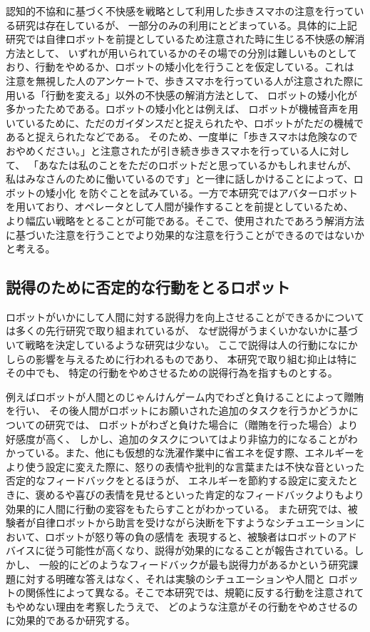 \documentclass{kuisthesis}
\begin{document}
認知的不協和に基づく不快感を戦略として利用した歩きスマホの注意を行っている研究\cite{Schneider2022}は存在しているが、
一部分のみの利用にとどまっている。具体的に上記研究では自律ロボットを前提としているため注意された時に生じる不快感の解消方法として、
いずれが用いられているかのその場での分別は難しいものとしており、行動をやめるか、ロボットの矮小化を行うことを仮定している。これは
注意を無視した人のアンケートで、歩きスマホを行っている人が注意された際に用いる「行動を変える」以外の不快感の解消方法として、
ロボットの矮小化が多かったためである。ロボットの矮小化とは例えば、
ロボットが機械音声を用いているために、ただのガイダンスだと捉えられたや、ロボットがただの機械であると捉えられたなどである。
そのため、一度単に「歩きスマホは危険なのでおやめください。」と注意されたが引き続き歩きスマホを行っている人に対して、
「あなたは私のことをただのロボットだと思っているかもしれませんが、私はみなさんのために働いているのです」と一律に話しかけることによって、ロボットの矮小化
を防ぐことを試みている。一方で本研究ではアバターロボットを用いており、オペレータとして人間が操作することを前提としているため、
より幅広い戦略をとることが可能である。そこで、使用されたであろう解消方法に基づいた注意を行うことでより効果的な注意を行うことができるのではないかと考える。

\subsection{説得のために否定的な行動をとるロボット}

ロボットがいかにして人間に対する説得力を向上させることができるかについては多くの先行研究で取り組まれているが、
なぜ説得がうまくいかないかに基づいて戦略を決定しているような研究は少ない。
ここで説得は人の行動になにかしらの影響を与えるために行われるものであり、
本研究で取り組む抑止は特にその中でも、
特定の行動をやめさせるための説得行為を指すものとする。

例えばロボットが人間とのじゃんけんゲーム内でわざと負けることによって贈賄を行い、
その後人間がロボットにお願いされた追加のタスクを行うかどうかについての研究\cite{sandoval2016can}では、
ロボットがわざと負けた場合に（贈賄を行った場合）より好感度が高く、
しかし、追加のタスクについてはより非協力的になることがわかっている。また、他にも仮想的な洗濯作業中に省エネを促す際、エネルギーをより使う設定に変えた際に、怒りの表情や批判的な言葉または不快な音といった否定的なフィードバックをとるほうが、
エネルギーを節約する設定に変えたときに、褒めるや喜びの表情を見せるといった肯定的なフィードバックよりもより効果的に人間に行動の変容をもたらすことがわかっている\cite{Midden2009}。
また研究\cite{paradeda2019makes}では、被験者が自律ロボットから助言を受けながら決断を下すようなシチュエーションにおいて、ロボットが怒り等の負の感情を
表現すると、被験者はロボットのアドバイスに従う可能性が高くなり、説得が効果的になることが報告されている。しかし、
一般的にどのようなフィードバックが最も説得力があるかという研究課題に対する明確な答えはなく、それは実験のシチュエーションや人間と
ロボットの関係性によって異なる。そこで本研究では、規範に反する行動を注意されてもやめない理由を考察したうえで、
どのような注意がその行動をやめさせるのに効果的であるか研究する。
\end{document}

